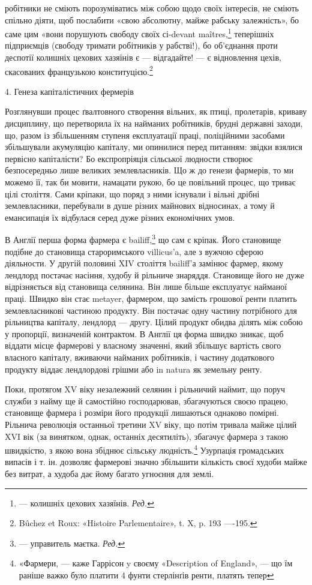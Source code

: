 \parcont{}  %
робітники не сміють порозуміватись між собою щодо своїх інтересів,
не сміють спільно діяти, щоб послабити «свою абсолютну,
майже рабську залежність», бо саме цим «вони порушують свободу
своїх сі-devant maîtres,\footnote*{
— колишніх цехових хазяїнів. \emph{Ред.}
} теперішніх підприємців (свободу
тримати робітників у рабстві!), бо об’єднання проти деспотії
колишніх цехових хазяїнів є — відгадайте! — є відновлення цехів,
скасованих французькою конституцією.\footnote{
Bûchez et Roux: «Histoire Parlementaire», t. X, p. 193 —-195.
}

4. Генеза капіталістичних фермерів

Розглянувши процес ґвалтовного створення вільних, як птиці,
пролетарів, криваву дисциплину, що перетворила їх на найманих
робітників, брудні державні заходи, що, разом із збільшенням
ступеня експлуатації праці, поліційними засобами збільшували
акумуляцію капіталу, ми опинилися перед питанням: звідки взялися
первісно капіталісти? Бо експропріяція сільської людности
створює безпосередньо лише великих землевласників. Що ж до
генези фармерів, то ми можемо її, так би мовити, намацати рукою,
бо це повільний процес, що триває цілі століття. Сами кріпаки,
що поряд з ними існували і вільні дрібні землевласники, перебували
в душе різних майнових відносинах, а тому й емансипація
їх відбулася серед дуже різних економічних умов.

В Англії перша форма фармера є bailiff,\footnote*{
— управитель маєтка. \emph{Ред.}
} що сам є кріпак.
Його становище подібне до становища староримського villicus’a,
але з вужчою сферою діяльности. У другій половині XIV століття
bailiff’а замінює фармер, якому лендлорд постачає насіння,
худобу й рільниче знаряддя. Становище його не дуже відрізняється
від становища селянина. Він лише більше експлуатує
найманої праці. Швидко він стає metayer, фармером, що замість
грошової ренти платить землевласникові частиною продукту.
Він постачає одну частину потрібного для рільництва капіталу,
лендлорд — другу. Цілий продукт обидва ділять між собою у
пропорції, визначеній контрактом. В Англії ця форма швидко
зникає, щоб віддати місце фармерові у власному значенні, який
збільшує вартість свого власного капіталу, вживаючи найманих
робітників, і частину додаткового продукту віддає лендлордові
грішми або in natura як земельну ренту.

Поки, протягом XV віку незалежний селянин і рільничий
наймит, що поруч служби з найму ще й самостійно господарював,
збагачуються своєю працею, становище фармера і розміри його
продукції лишаються однаково помірні. Рільнича революція
останньої третини XV віку, що потім тривала майже цілий XVI вік
(за винятком, однак, останніх десятиліть), збагачує фармера з
такою швидкістю, з якою вона збіднює сільську людність.\footnote{
«Фармери, — каже Гаррісон y своєму «Description of England», —
що їм раніше важко було платити 4 фунти стерлінґів ренти, платять тепер
}
Узурпація громадських випасів і т. ін. дозволяє фармерові значно
збільшити кількість своєї худоби майже без витрат, а худоба дає
йому багато угноєння для землі.

